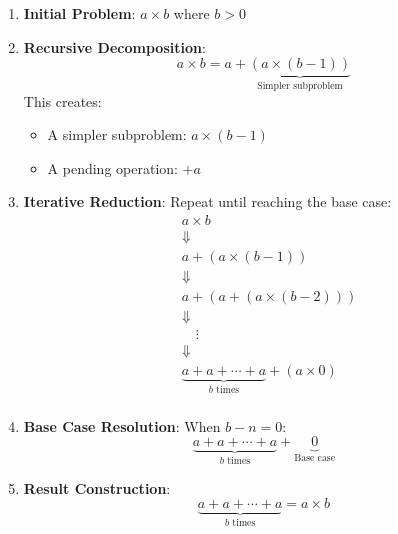 \documentclass{article}
\begin{document}
\begin{enumerate}
    \item \textbf{Initial Problem}: \(a \times b\) where \(b > 0\)

    \item \textbf{Recursive Decomposition}:
          \[
              a \times b = a + \underbrace{(a \times (b - 1))}_{\text{Simpler subproblem}}
          \]
          This creates:
          \begin{itemize}
              \item A simpler subproblem: \(a \times (b - 1)\)
              \item A pending operation: \(+ a\)
          \end{itemize}

    \item \textbf{Iterative Reduction}:
          Repeat until reaching the base case:
          \[
              \begin{aligned}
                   & a \times b                                                       \\
                   & \Downarrow                                                       \\
                   & a + (a \times (b-1))                                             \\
                   & \Downarrow                                                       \\
                   & a + (a + (a \times (b-2)))                                       \\
                   & \Downarrow                                                       \\
                   & \quad \vdots                                                     \\
                   & \Downarrow                                                       \\
                   & \underbrace{a + a + \cdots + a}_{b \text{ times}} + (a \times 0) \\
              \end{aligned}
          \]

    \item \textbf{Base Case Resolution}:
          When \(b - n = 0\):
          \[
              \underbrace{a + a + \cdots + a}_{b \text{ times}} + \underbrace{0}_{\text{Base case}}
          \]

    \item \textbf{Result Construction}:
          \[
              \underbrace{a + a + \cdots + a}_{b \text{ times}} = a \times b
          \]
\end{enumerate}
\end{document}
